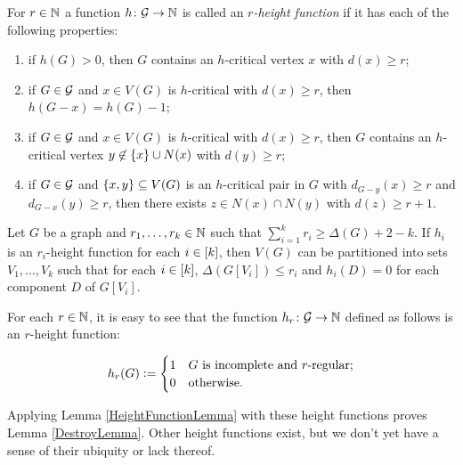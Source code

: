 \begin{defn}
For $r \in \mathbb{N}$ a function $h\colon \mathcal{G} \rightarrow \mathbb{N}$ is called an \emph{$r$-height function} if it has each of the following properties:
\begin{enumerate}
\item if $h(G) > 0$, then $G$ contains an $h$-critical vertex $x$ with $d(x) \geq r$;
\item if $G \in \mathcal{G}$ and $x \in V(G)$ is $h$-critical with $d(x) \geq r$, then $h(G-x) = h(G) - 1$;
\item if $G \in \mathcal{G}$ and $x \in V(G)$ is $h$-critical with $d(x) \geq r$, then $G$ contains an $h$-critical vertex $y \not \in \left\{ x \right\} \cup N(x)$ with $d(y) \geq r$;
\item if $G \in \mathcal{G}$ and $\left\{ x, y \right\} \subseteq V(G)$ is an $h$-critical pair in $G$ with $d_{G-y}(x) \geq r$ and $d_{G-x}(y) \geq r$, then there exists $z \in N(x) \cap N(y)$ with $d(z) \geq r + 1$.
\end{enumerate}
\end{defn}

\begin{lem}\label{HeightFunctionLemma}
Let $G$ be a graph and $r_1, \ldots, r_k \in \mathbb{N}$ such that $\sum_{i=1}^k r_i \geq \Delta(G) + 2 - k$. If $h_i$ is an $r_i$-height function for each $i \in \left[k\right]$, then $V(G)$ can be partitioned into sets $V_1, \ldots, V_k$ such that for each $i \in \left[k\right]$, $\Delta(G[V_i]) \leq r_i$ and $h_i(D) = 0$ for each component $D$ of $G[V_i]$.
\end{lem}

\noindent For each $r \in \mathbb{N}$, it is easy to see that the function $h_r\colon \mathcal{G} \rightarrow \mathbb{N}$ defined as follows is an $r$-height function:

\[h_r(G) \mathrel{\mathop:}= 
\begin{cases}
1 & \text{$G$ is incomplete and $r$-regular;}\\
0 & \text{otherwise.}
\end{cases}\]

Applying Lemma \ref{HeightFunctionLemma} with these height functions proves Lemma \ref{DestroyLemma}.  Other height functions exist, but we don't yet have a sense of their ubiquity or lack thereof.


